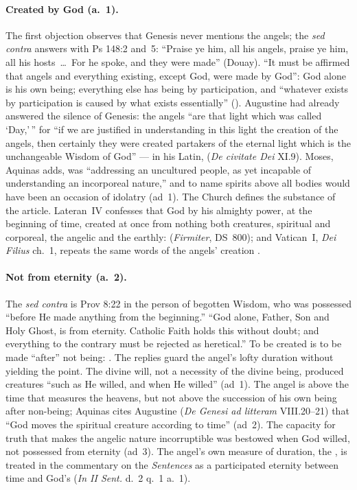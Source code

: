 \paragraph{Created by God (a.~1).} The first objection observes that
Genesis never mentions the angels; the \emph{sed contra} answers with
Ps 148:2 and~5: ``Praise ye him, all his angels, praise ye him, all his
hosts~\dots\ For he spoke, and they were made'' (Douay). ``It must be
affirmed that angels and everything existing, except God, were made by
God'': God alone is his own being; everything else has being by
participation, and ``whatever exists by participation is caused by what
exists essentially'' ().
Augustine had already answered the silence of Genesis: the angels ``are
that light which was called `Day,'\,'' for ``if we are justified in
understanding in this light the creation of the angels, then certainly
they were created partakers of the eternal light which is the
unchangeable Wisdom of God'' --- in his Latin,  (\emph{De
civitate Dei} XI.9). Moses, Aquinas adds, was ``addressing an uncultured
people, as yet incapable of understanding an incorporeal nature,'' and
to name spirits above all bodies would have been an occasion of idolatry
(ad~1). The Church defines the substance of the article. Lateran~IV
confesses that God by his almighty power, at the beginning of time,
created at once from nothing both creatures, spiritual and corporeal, the
angelic and the earthly:  (\emph{Firmiter}, DS~800); and Vatican~I, \emph{Dei Filius}
ch.~1, repeats the same words of the angels' creation .

\paragraph{Not from eternity (a.~2).} The \emph{sed contra} is
Prov 8:22 in the person of begotten Wisdom, who was possessed ``before
He made anything from the beginning.'' ``God alone, Father, Son and Holy
Ghost, is from eternity. Catholic Faith holds this without doubt; and
everything to the contrary must be rejected as heretical.'' To be
created  is to be made ``after'' not being: . The replies guard the angel's lofty duration
without yielding the point. The divine will, not a necessity of the
divine being, produced creatures ``such as He willed, and when He
willed'' (ad~1). The angel is above the time that measures the heavens,
but not above the succession of his own being after non-being; Aquinas
cites Augustine (\emph{De Genesi ad litteram} VIII.20--21) that ``God
moves the spiritual creature according to time'' (ad~2). The capacity
for truth that makes the angelic nature incorruptible was bestowed when
God willed, not possessed from eternity (ad~3). The angel's own measure
of duration, the , is treated in the commentary on the
\emph{Sentences} as a participated eternity between time and God's
(\emph{In II Sent.} d.~2 q.~1 a.~1).

